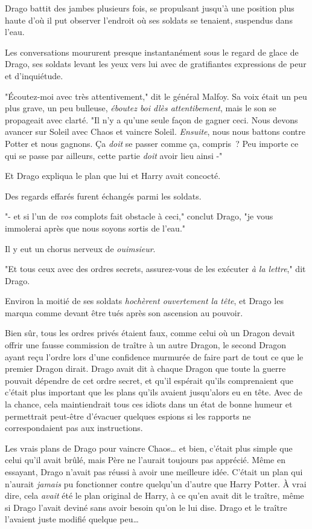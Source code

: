 Drago battit des jambes plusieurs fois, se propulsant jusqu'à une position plus haute d'où il put observer l'endroit où ses soldats se tenaient, suspendus dans l'eau.

Les conversations moururent presque instantanément sous le regard de glace de Drago, ses soldats levant les yeux vers lui avec de gratifiantes expressions de peur et d'inquiétude.

"Écoutez-moi avec très attentivement," dit le général Malfoy. Sa voix était un peu plus grave, un peu bulleuse, \emph{éboutez boi dlès attentibement}, mais le son se propageait avec clarté. "Il n'y a qu'une seule façon de gagner ceci. Nous devons avancer sur Soleil avec Chaos et vaincre Soleil. \emph{Ensuite}, nous nous battons contre Potter et nous gagnons. Ça \emph{doit} se passer comme ça, compris~? Peu importe ce qui se passe par ailleurs, cette partie \emph{doit} avoir lieu ainsi -"

Et Drago expliqua le plan que lui et Harry avait concocté.

Des regards effarés furent échangés parmi les soldats.

"- et si l'un de \emph{vos} complots fait obstacle à ceci," conclut Drago, "je vous immolerai après que nous soyons sortis de l'eau."

Il y eut un chorus nerveux de \emph{ouimsieur}.

"Et tous ceux avec des ordres secrets, assurez-vous de les exécuter \emph{à la lettre}," dit Drago.

Environ la moitié de ses soldats \emph{hochèrent ouvertement la tête}, et Drago les marqua comme devant être tués après son ascension au pouvoir.

Bien sûr, tous les ordres privés étaient faux, comme celui où un Dragon devait offrir une fausse commission de traître à un autre Dragon, le second Dragon ayant reçu l'ordre lors d'une confidence murmurée de faire part de tout ce que le premier Dragon dirait. Drago avait dit à chaque Dragon que toute la guerre pouvait dépendre de cet ordre secret, et qu'il espérait qu'ils comprenaient que c'était plus important que les plans qu'ils avaient jusqu'alors eu en tête. Avec de la chance, cela maintiendrait tous ces idiots dans un état de bonne humeur et permettrait peut-être d'évacuer quelques espions si les rapports ne correspondaient pas aux instructions.

Les vrais plans de Drago pour vaincre Chaos… et bien, c'était plus simple que celui qu'il avait brûlé, mais Père ne l'aurait toujours pas apprécié. Même en essayant, Drago n'avait pas réussi à avoir une meilleure idée. C'était un plan qui n'aurait \emph{jamais} pu fonctionner contre quelqu'un d'autre que Harry Potter. À vrai dire, cela \emph{avait} été le plan original de Harry, à ce qu'en avait dit le traître, même si Drago l'avait deviné sans avoir besoin qu'on le lui dise. Drago et le traître l'avaient juste modifié quelque peu…

